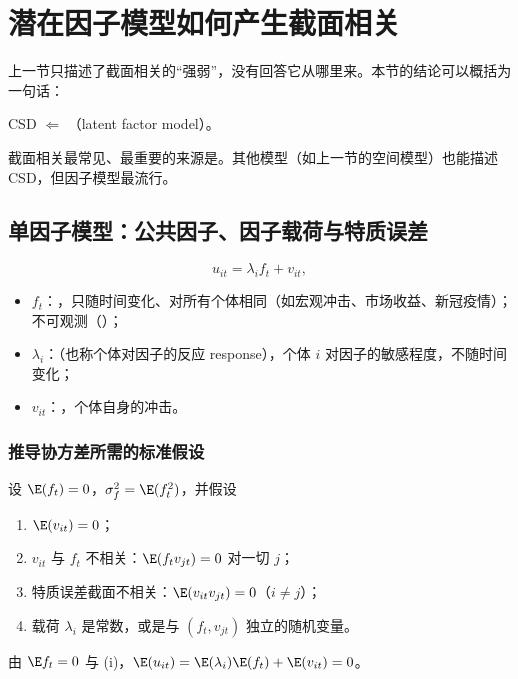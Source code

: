 \section{潜在因子模型如何产生截面相关}\label{sec:U13a-factorcsd}

上一节只描述了截面相关的“强弱”，没有回答它从哪里来。本节的结论可以概括为一句话：
\begin{center}
CSD $\Longleftarrow$ （latent factor model）。
\end{center}
截面相关最常见、最重要的来源是。其他模型（如上一节的空间模型）也能描述 CSD，但因子模型最流行。

\subsection{单因子模型：公共因子、因子载荷与特质误差}

\begin{defn}[单因子模型]\label{def:U13a-onefactor}
\[
u_{it}=\lambda_if_t+v_{it},
\]
\begin{itemize}
\item $f_t$：，只随时间变化、对所有个体相同（如宏观冲击、市场收益、新冠疫情）；不可观测（）；
\item $\lambda_i$：（也称个体对因子的反应 response），个体 $i$ 对因子的敏感程度，不随时间变化；
\item $v_{it}$：，个体自身的冲击。
\end{itemize}
\end{defn}

\subsubsection{推导协方差所需的标准假设}

设 $\E(f_t)=0$，$\sigma_f^2=\E(f_t^2)$，并假设
\begin{enumerate}[label=(\roman*)]
\item $\E(v_{it})=0$；
\item $v_{it}$ 与 $f_t$ 不相关：$\E(f_tv_{jt})=0$ 对一切 $j$；
\item 特质误差截面不相关：$\E(v_{it}v_{jt})=0$（$i\neq j$）；
\item 载荷 $\lambda_i$ 是常数，或是与 $(f_t,v_{jt})$ 独立的随机变量。
\end{enumerate}
由 $\E f_t=0$ 与 (i)，$\E(u_{it})=\E(\lambda_i)\E(f_t)+\E(v_{it})=0$。


